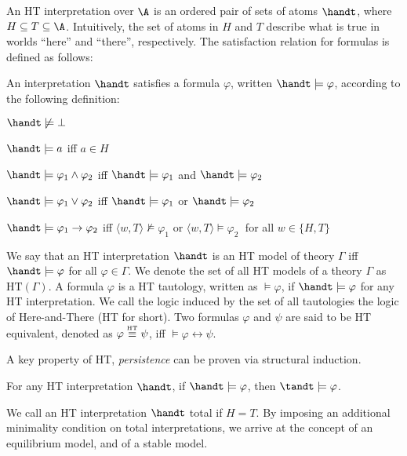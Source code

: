 An HT interpretation over $\A$ is an ordered pair of sets of atoms
$\handt$, where $H \subseteq T \subseteq \A$. Intuitively, the set of
atoms in $H$ and $T$ describe what is true in worlds ``here'' and
``there'', respectively. The satisfaction relation for formulas is
defined as follows:

\begin{definition}[HT satisfaction]
    An interpretation $\handt$ satisfies a formula $\varphi$, written $\handt \models \varphi$, according to the following definition:
    \begin{description}
        \item $\handt \not \models \bot$
        \item $\handt \models a$ iff $a\in H$
        \item $\handt \models \varphi_1 \wedge \varphi_2$ iff $\handt \models \varphi_1$ and  $\handt \models \varphi_2$
        \item $\handt \models \varphi_1 \vee \varphi_2$ iff $\handt \models \varphi_1$ or  $\handt \models \varphi_2$
        \item $\handt \models \varphi_1 \to \varphi_2$ iff $\langle w,T \rangle \not \models \varphi_1$ or  $\langle w,T \rangle \models \varphi_2\;$ for all 
        $w \in \{H,T\}$
    \end{description}
\end{definition}

We say that an HT interpretation $\handt$ is an HT model of theory
$\Gamma$ iff $\handt \models \varphi$ for all $\varphi \in \Gamma$. We
denote the set of all HT models of a theory $\Gamma$ as
$\text{HT}(\Gamma)$. A formula $\varphi$ is a HT tautology, written as
$\models \varphi$, if $\handt \models \varphi$ for any HT
interpretation. We call the logic induced by the set of all
tautologies the logic of Here-and-There (HT for short). Two formulas
$\varphi$ and $\psi$ are said to be HT equivalent, denoted as
$\varphi \stackrel{\normalfont\mbox{\tiny HT}}{\equiv} \psi$, iff $\models \varphi \leftrightarrow \psi$.

A key property of HT, \textit{persistence} can be proven via
structural induction.

\begin{proposition}[Persistence]
  For any HT interpretation $\handt$, if $\handt \models \varphi$,
  then $\tandt \models \varphi$.
\end{proposition}

We call an HT interpretation $\handt$ total if $H=T$. By imposing an
additional minimality condition on total interpretations, we arrive at
the concept of an equilibrium model, and of a stable model.

